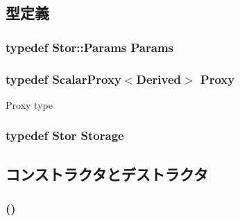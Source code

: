 \subsection{型定義}
\hypertarget{classStats_1_1VectorBase_a24c5f88dc162c95e0b32ade67a7ea674}{
\subsubsection[{Params}]{\setlength{\rightskip}{0pt plus 5cm}typedef Stor::Params {\bf Params}}}
\label{classStats_1_1VectorBase_a24c5f88dc162c95e0b32ade67a7ea674}
\hypertarget{classStats_1_1VectorBase_ac21218152a73febec4e5dfcc36b04ca5}{
\subsubsection[{Proxy}]{\setlength{\rightskip}{0pt plus 5cm}typedef {\bf ScalarProxy}$<$Derived$>$ {\bf Proxy}}}
\label{classStats_1_1VectorBase_ac21218152a73febec4e5dfcc36b04ca5}
Proxy type \hypertarget{classStats_1_1VectorBase_a5d4a6db0e7c32292f54a08d05c671bd1}{
\subsubsection[{Storage}]{\setlength{\rightskip}{0pt plus 5cm}typedef Stor {\bf Storage}}}
\label{classStats_1_1VectorBase_a5d4a6db0e7c32292f54a08d05c671bd1}


\subsection{コンストラクタとデストラクタ}
\hypertarget{classStats_1_1VectorBase_a146b52fc4bf3790ed55a6c097ca3e76b}{
\subsubsection[{VectorBase}]{ ()}}
\label{classStats_1_1VectorBase_a146b52fc4bf3790ed55a6c097ca3e76b}



